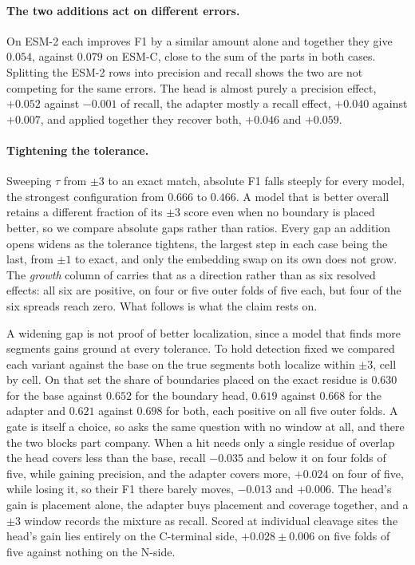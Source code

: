 \documentclass{article}
\begin{document}
\paragraph{The two additions act on different errors.} On ESM-2 each improves F1 by a similar amount alone and together they give $0.054$, against $0.079$ on ESM-C, close to the sum of the parts in both cases. Splitting the ESM-2 rows into precision and recall shows the two are not competing for the same errors. The head is almost purely a precision effect, $+0.052$ against $-0.001$ of recall, the adapter mostly a recall effect, $+0.040$ against $+0.007$, and applied together they recover both, $+0.046$ and $+0.059$.

\paragraph{Tightening the tolerance.} Sweeping $\tau$ from $\pm3$ to an exact match, absolute F1 falls steeply for every model, the strongest configuration from $0.666$ to $0.466$. A model that is better overall retains a different fraction of its $\pm3$ score even when no boundary is placed better, so we compare absolute gaps rather than ratios. Every gap an addition opens widens as the tolerance tightens, the largest step in each case being the last, from $\pm1$ to exact, and only the embedding swap on its own does not grow. The \emph{growth} column of  carries that as a direction rather than as six resolved effects: all six are positive, on four or five outer folds of five each, but four of the six spreads reach zero. What follows is what the claim rests on.

A widening gap is not proof of better localization, since a model that finds more segments gains ground at every tolerance. To hold detection fixed we compared each variant against the base on the true segments both localize within $\pm3$, cell by cell. On that set the share of boundaries placed on the exact residue is $0.630$ for the base against $0.652$ for the boundary head, $0.619$ against $0.668$ for the adapter and $0.621$ against $0.698$ for both, each positive on all five outer folds. A gate is itself a choice, so  asks the same question with no window at all, and there the two blocks part company. When a hit needs only a single residue of overlap the head covers less than the base, recall $-0.035$ and below it on four folds of five, while gaining precision, and the adapter covers more, $+0.024$ on four of five, while losing it, so their F1 there barely moves, $-0.013$ and $+0.006$. The head's gain is placement alone, the adapter buys placement and coverage together, and a $\pm3$ window records the mixture as recall. Scored at individual cleavage sites the head's gain lies entirely on the C-terminal side, $+0.028\pm0.006$ on five folds of five against nothing on the N-side.
\end{document}
